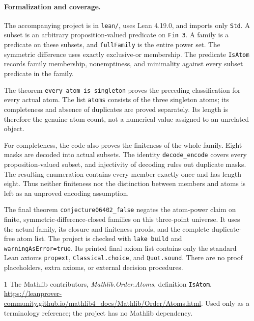 \documentclass[11pt]{article}
\begin{document}
\paragraph{Formalization and coverage.}
The accompanying project is in \texttt{lean/}, uses Lean 4.19.0, and imports only \texttt{Std}. A subset is an arbitrary proposition-valued predicate on \texttt{Fin 3}. A family is a predicate on these subsets, and \texttt{fullFamily} is the entire power set. The symmetric difference uses exactly exclusive-or membership. The predicate \texttt{IsAtom} records family membership, nonemptiness, and minimality against every subset predicate in the family.

The theorem \texttt{every\_atom\_is\_singleton} proves the preceding classification for every actual atom. The list \texttt{atoms} consists of the three singleton atoms; its completeness and absence of duplicates are proved separately. Its length is therefore the genuine atom count, not a numerical value assigned to an unrelated object.

For completeness, the code also proves the finiteness of the whole family. Eight masks are decoded into actual subsets. The identity \texttt{decode\_encode} covers every proposition-valued subset, and injectivity of decoding rules out duplicate masks. The resulting enumeration contains every member exactly once and has length eight. Thus neither finiteness nor the distinction between members and atoms is left as an unproved encoding assumption.

The final theorem \texttt{conjecture06402\_false} negates the atom-power claim on finite, symmetric-difference-closed families on this three-point universe. It uses the actual family, its closure and finiteness proofs, and the complete duplicate-free atom list. The project is checked with \texttt{lake build} and \texttt{warningAsError=true}. Its printed final axiom list contains only the standard Lean axioms \texttt{propext}, \texttt{Classical.choice}, and \texttt{Quot.sound}. There are no proof placeholders, extra axioms, or external decision procedures.

\begin{thebibliography}{1}
The Mathlib contributors, \emph{Mathlib.Order.Atoms}, definition \texttt{IsAtom}.
\url{https://leanprover-community.github.io/mathlib4_docs/Mathlib/Order/Atoms.html}.
Used only as a terminology reference; the project has no Mathlib dependency.
\end{thebibliography}
\end{document}
